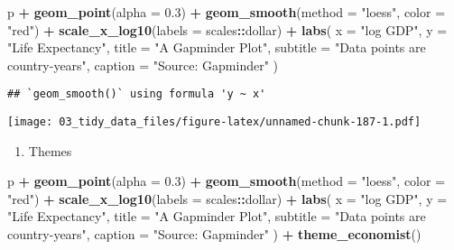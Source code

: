 \documentclass[
]{book}
\newenvironment{Shaded}{\begin{snugshade}}{\end{snugshade}}
\newcommand{\DataTypeTok}[1]{\textcolor[rgb]{0.13,0.29,0.53}{#1}}
\newcommand{\FloatTok}[1]{\textcolor[rgb]{0.00,0.00,0.81}{#1}}
\newcommand{\KeywordTok}[1]{\textcolor[rgb]{0.13,0.29,0.53}{\textbf{#1}}}
\newcommand{\NormalTok}[1]{#1}
\newcommand{\OperatorTok}[1]{\textcolor[rgb]{0.81,0.36,0.00}{\textbf{#1}}}
\newcommand{\StringTok}[1]{\textcolor[rgb]{0.31,0.60,0.02}{#1}}
\providecommand{\tightlist}{%
  \setlength{\itemsep}{0pt}\setlength{\parskip}{0pt}}
\begin{document}
\begin{Shaded}
\begin{Highlighting}[]
\NormalTok{p }\OperatorTok{+}\StringTok{ }\KeywordTok{geom\_point}\NormalTok{(}\DataTypeTok{alpha =} \FloatTok{0.3}\NormalTok{) }\OperatorTok{+}
\StringTok{  }\KeywordTok{geom\_smooth}\NormalTok{(}\DataTypeTok{method =} \StringTok{"loess"}\NormalTok{, }\DataTypeTok{color =} \StringTok{"red"}\NormalTok{) }\OperatorTok{+}
\StringTok{  }\KeywordTok{scale\_x\_log10}\NormalTok{(}\DataTypeTok{labels =}\NormalTok{ scales}\OperatorTok{::}\NormalTok{dollar) }\OperatorTok{+}
\StringTok{  }\KeywordTok{labs}\NormalTok{(}
    \DataTypeTok{x =} \StringTok{"log GDP"}\NormalTok{,}
    \DataTypeTok{y =} \StringTok{"Life Expectancy"}\NormalTok{,}
    \DataTypeTok{title =} \StringTok{"A Gapminder Plot"}\NormalTok{,}
    \DataTypeTok{subtitle =} \StringTok{"Data points are country{-}years"}\NormalTok{,}
    \DataTypeTok{caption =} \StringTok{"Source: Gapminder"}
\NormalTok{  )}
\end{Highlighting}
\end{Shaded}

\begin{verbatim}
## `geom_smooth()` using formula 'y ~ x'
\end{verbatim}

\texttt{[image: 03\_tidy\_data\_files/figure-latex/unnamed-chunk-187-1.pdf]}

\begin{enumerate}
\def\labelenumi{\arabic{enumi}.}
\setcounter{enumi}{5}
\tightlist
\item
  Themes
\end{enumerate}

\begin{Shaded}
\begin{Highlighting}[]
\NormalTok{p }\OperatorTok{+}\StringTok{ }\KeywordTok{geom\_point}\NormalTok{(}\DataTypeTok{alpha =} \FloatTok{0.3}\NormalTok{) }\OperatorTok{+}
\StringTok{  }\KeywordTok{geom\_smooth}\NormalTok{(}\DataTypeTok{method =} \StringTok{"loess"}\NormalTok{, }\DataTypeTok{color =} \StringTok{"red"}\NormalTok{) }\OperatorTok{+}
\StringTok{  }\KeywordTok{scale\_x\_log10}\NormalTok{(}\DataTypeTok{labels =}\NormalTok{ scales}\OperatorTok{::}\NormalTok{dollar) }\OperatorTok{+}
\StringTok{  }\KeywordTok{labs}\NormalTok{(}
    \DataTypeTok{x =} \StringTok{"log GDP"}\NormalTok{,}
    \DataTypeTok{y =} \StringTok{"Life Expectancy"}\NormalTok{,}
    \DataTypeTok{title =} \StringTok{"A Gapminder Plot"}\NormalTok{,}
    \DataTypeTok{subtitle =} \StringTok{"Data points are country{-}years"}\NormalTok{,}
    \DataTypeTok{caption =} \StringTok{"Source: Gapminder"}
\NormalTok{  ) }\OperatorTok{+}
\StringTok{  }\KeywordTok{theme\_economist}\NormalTok{()}
\end{Highlighting}
\end{Shaded}
\end{document}
